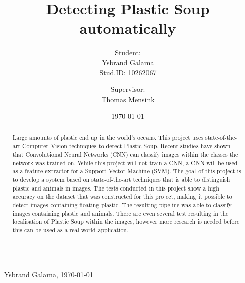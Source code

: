 \documentclass[a4paper, 11pt]{article}
\title{Detecting Plastic Soup automatically}
\author{Student:\\Ysbrand Galama \\ Stud.ID: 10262067 \and Supervisor:\\ Thomas Mensink }
\date{\today}
\begin{document}

\ifx\showintro\undefined

\thispagestyle{empty}
$\,$
\vfill
\begin{abstract}
Large amounts of plastic end up in the world's oceans.
This project uses state-of-the-art Computer Vision techniques to detect Plastic Soup.
Recent studies have shown that Convolutional Neural Networks (CNN) can classify images within the classes the network was trained on.
While this project will not train a CNN, a CNN will be used as a feature extractor for a Support Vector Machine (SVM).
The goal of this project is to develop a system based on state-of-the-art techniques that is able to distinguish plastic and animals in images.
The tests conducted in this project show a high accuracy on the dataset that was constructed for this project, making it possible to detect images containing floating plastic.
The resulting pipeline was able to classify images containing plastic and animals.
There are even several test resulting in the localisation of Plastic Soup within the images, however more research is needed before this can be used as a real-world application.
\end{abstract}
\vfill
\vfill
$\,$
\newpage
\tableofcontents
\newpage
\else
{}\\ \mbox{}~\hfill{Ysbrand Galama, \today}
\fi




\ifx\showpbreak\undefined \clearpage \fi


\ifx\showpbreak\undefined \clearpage \fi









\end{document}

